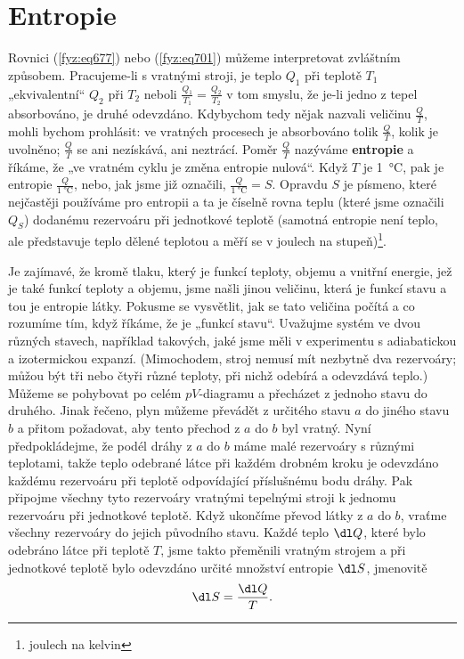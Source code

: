   \section{Entropie}\label{fyz:IchapXLIVsecVI}
    Rovnici (\ref{fyz:eq677}) nebo (\ref{fyz:eq701}) můžeme interpretovat zvláštním způsobem.
    Pracujeme-li s vratnými stroji, je teplo \(Q_1\) při teplotě \(T_1\) „ekvivalentní“ \(Q_2\) při
    \(T_2\) neboli \(\frac{Q_1}{ T_1} = \frac{Q_2}{T_2}\) v tom smyslu, že je-li jedno z tepel
    absorbováno, je druhé odevzdáno. Kdybychom tedy nějak nazvali veličinu \(\frac{Q}{T}\), mohli
    bychom prohlásit: ve vratných procesech je absorbováno tolik \(\frac{Q}{T}\), kolik je uvolněno;
    \(\frac{Q}{T}\) se ani nezískává, ani neztrácí. Poměr \(\frac{Q}{T}\) nazýváme \textbf{entropie}
    a říkáme, že „ve vratném cyklu je změna entropie nulová“. Když \(T\) je \SI{1}{\celsius}, pak je
    entropie \(\frac{Q}{\SI{1}{\celsius}}\), nebo, jak jsme již označili,
    \(\frac{Q}{\SI{1}{\celsius}} = S\). Opravdu \(S\) je písmeno, které nejčastěji používáme pro
    entropii a ta je číselně rovna teplu (které jsme označili \(Q_S\)) dodanému rezervoáru při
    jednotkové teplotě (samotná entropie není teplo, ale představuje teplo dělené teplotou a měří se
    v joulech na stupeň)\footnote{joulech na kelvin}.
    
    Je zajímavé, že kromě tlaku, který je funkcí teploty, objemu a vnitřní energie, jež je také
    funkcí teploty a objemu, jsme našli jinou veličinu, která je funkcí stavu a tou je entropie
    látky. Pokusme se vysvětlit, jak se tato veličina počítá a co rozumíme tím, když říkáme, že je
    „funkcí stavu“. Uvažujme systém ve dvou různých stavech, například takových, jaké jsme měli v
    experimentu s adiabatickou a izotermickou expanzí. (Mimochodem, stroj nemusí mít nezbytně dva
    rezervoáry; můžou být tři nebo čtyři různé teploty, při nichž odebírá a odevzdává teplo.) Můžeme
    se pohybovat po celém \(pV\)-diagramu a přecházet z jednoho stavu do druhého. Jinak řečeno, plyn
    můžeme převádět z určitého stavu \(a\) do jiného stavu \(b\) a přitom požadovat, aby tento
    přechod z \(a\) do \(b\) byl vratný. Nyní předpokládejme, že podél dráhy z \(a\) do \(b\) máme
    malé rezervoáry s různými teplotami, takže teplo odebrané látce při každém drobném kroku je
    odevzdáno každému rezervoáru při teplotě odpovídající příslušnému bodu dráhy. Pak připojme
    všechny tyto rezervoáry vratnými tepelnými stroji k jednomu rezervoáru při jednotkové teplotě.
    Když ukončíme převod látky z \(a\) do \(b\), vraťme všechny rezervoáry do jejich původního
    stavu. Každé teplo \(\dl Q\), které bylo odebráno látce při teplotě \(T\), jsme takto přeměnili
    vratným strojem a při jednotkové teplotě bylo odevzdáno určité množství entropie \(\dl S\),
    jmenovitě
    \begin{equation}\label{fyz:eq704}
      \dl S=\frac{\dl Q}{T}.
    \end{equation}

